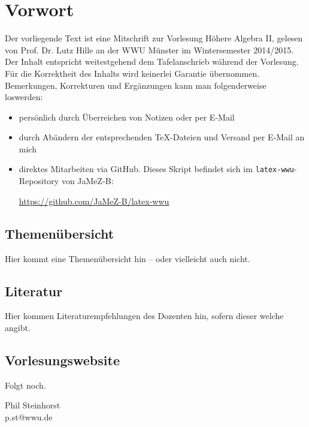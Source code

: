 \section*{Vorwort}
\label{sec:preface}
	Der vorliegende Text ist eine Mitschrift zur Vorlesung Höhere Algebra II, gelesen von Prof. Dr. Lutz Hille an der WWU Münster im Wintersemester 2014/2015. Der Inhalt entspricht weitestgehend dem Tafelanschrieb während der Vorlesung. Für die Korrektheit des Inhalts wird keinerlei Garantie übernommen. Bemerkungen, Korrekturen und Ergänzungen kann man folgenderweise loswerden:
	\begin{itemize}
		\item persönlich durch Überreichen von Notizen oder per E-Mail
		\item durch Abändern der entsprechenden TeX-Dateien und Versand per E-Mail an mich
		\item direktes Mitarbeiten via GitHub. Dieses Skript befindet sich im \texttt{latex-wwu}-Repository von JaMeZ-B:
		\begin{center}
			\url{https://github.com/JaMeZ-B/latex-wwu}
		\end{center}
	\end{itemize}

\subsection*{Themenübersicht}
\label{sub:content}
	Hier kommt eine Themenübersicht hin -- oder vielleicht auch nicht.

\subsection*{Literatur}
\label{sub:lit}
	Hier kommen Literaturempfehlungen des Dozenten hin, sofern dieser welche angibt.

\subsection*{Vorlesungswebsite}
\label{sub:link}
	Folgt noch.



\vfill
\begin{flushright}
	Phil Steinhorst \\
	p.st@wwu.de
\end{flushright}
\newpage
